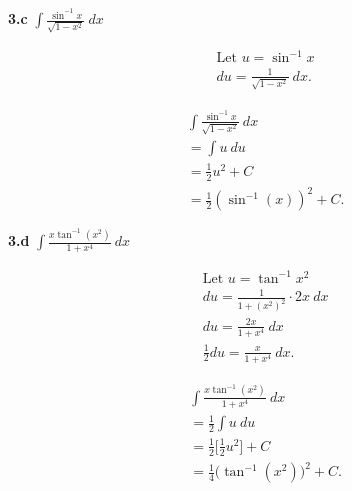 \documentclass{report}
\begin{document}
    \bigbreak \noindent 
    \begin{mdframed}
        \textbf{3.c} $\int \frac{\sin^{-1}{x}}{\sqrt{1-x^{2}}}\ dx $
    \end{mdframed}
    \bigbreak \noindent 
    \begin{minipage}[t]{0.47\textwidth}
    \begin{align*}
        &\text{Let $u=\sin^{-1}{x}$} \\
        &du = \frac{1}{\sqrt{1-x^{2}}}\ dx 
    .\end{align*}
    \end{minipage}
    \begin{minipage}[t]{0.35\textwidth}
    \begin{align*}
        &\int \frac{\sin^{-1}{x}}{\sqrt{1-x^{2}}}\ dx  \\
        &=\int u\ du \\
        &=\frac{1}{2}u^{2} + C \\
        &= \frac{1}{2}(\sin^{-1}{(x)})^{2} + C
    .\end{align*}
    \end{minipage}

    \bigbreak \noindent 
    \begin{mdframed}
        \textbf{3.d} $\int \frac{x\tan^{-1}{(x^{2})}}{1+ x^{4}}\ dx $
    \end{mdframed}
    \bigbreak \noindent 
    \begin{minipage}[t]{0.47\textwidth}
    \begin{align*}
        &\text{Let $u=\tan^{-1}{x^{2}}$} \\
        &du = \frac{1}{1+(x^{2})^{2}}\cdot 2x\ dx \\
        &du = \frac{2x}{1+x^{4}}\ dx \\
        &\frac{1}{2}du = \frac{x}{1+x^{4}}\ dx
    .\end{align*}
    \end{minipage}
    \begin{minipage}[t]{0.37\textwidth}
    \begin{align*}
        &\int \frac{x\tan^{-1}{(x^{2})}}{1+ x^{4}}\ dx \\
        &=\frac{1}{2}\int u\ du \\
        &=\frac{1}{2}\bigg[\frac{1}{2}u^{2}\bigg] + C \\
        &=\frac{1}{4}\bigg(\tan^{-1}{(x^{2})}\bigg)^{2} + C
    .\end{align*}
    \end{minipage}
    

    


    
\end{document}
